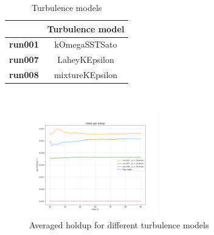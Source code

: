 \documentclass[11pt,a4paper]{article}
\begin{document}
\begin{table}[H]
    \centering 
    \begin{tabular}{|p{8em} c |}
    \hline
    \rowcolor{bluePoli!40}
    & \textbf{Turbulence model} \T\B \\
    \hline \hline
    \textbf{run001} & kOmegaSSTSato \T\B \\
    \textbf{run007} & LaheyKEpsilon \T\B \\
    \textbf{run008} & mixtureKEpsilon \T\B \\
    \hline
    \end{tabular}
    \\[10pt]
    \caption{Turbulence models}
    \label{table:turbulence_models}
\end{table}

\begin{figure}[H]
    \centering
    \includegraphics[width=0.5\textwidth]{Images/graphs/turbmodel/holdUp10.png}
    \caption{Averaged holdup for different turbulence models}
    \label{fig:holdup_turbmodel}
\end{figure}
\end{document}
